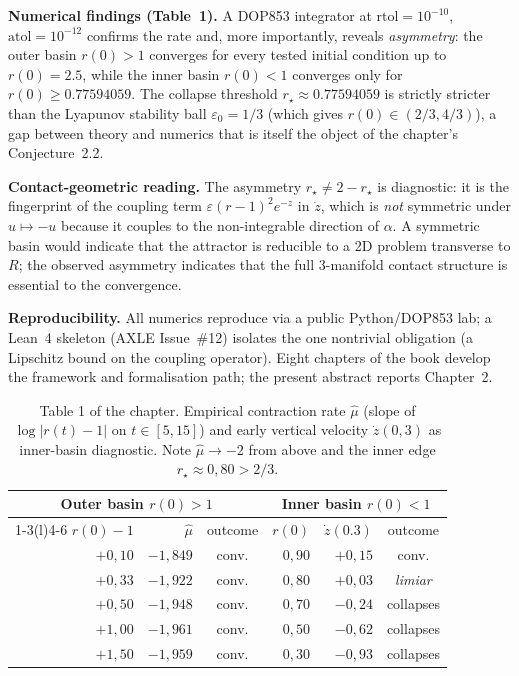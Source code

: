 \documentclass[11pt,a4paper]{article}
\begin{document}
\textbf{Numerical findings (Table~1).} A DOP853 integrator at $\mathrm{rtol}=10^{-10}$, $\mathrm{atol}=10^{-12}$ confirms the rate and, more importantly, reveals \emph{asymmetry}: the outer basin $r(0)>1$ converges for every tested initial condition up to $r(0)=2.5$, while the inner basin $r(0)<1$ converges only for $r(0) \geq 0.77594059$. The collapse threshold $r_\star \approx 0.77594059$ is strictly stricter than the Lyapunov stability ball $\varepsilon_0 = 1/3$ (which gives $r(0) \in (2/3, 4/3)$), a gap between theory and numerics that is itself the object of the chapter's Conjecture~2.2.

\textbf{Contact-geometric reading.} The asymmetry $r_\star \neq 2-r_\star$ is diagnostic: it is the fingerprint of the coupling term $\varepsilon(r-1)^2 e^{-z}$ in $\dot z$, which is \emph{not} symmetric under $u \mapsto -u$ because it couples to the non-integrable direction of $\alpha$. A symmetric basin would indicate that the attractor is reducible to a 2D problem transverse to $R$; the observed asymmetry indicates that the full 3-manifold contact structure is essential to the convergence.

\textbf{Reproducibility.} All numerics reproduce via a public Python/DOP853 lab; a Lean~4 skeleton (AXLE Issue~\#12) isolates the one nontrivial obligation (a Lipschitz bound on the coupling operator). Eight chapters of the book develop the framework and formalisation path; the present abstract reports Chapter~2.

\begin{table}[h]
\centering
\small
\begin{tabular}{@{}rrc@{\hskip 1.5em}rrc@{}}
\toprule
\multicolumn{3}{c}{\textbf{Outer basin} $r(0)>1$} & \multicolumn{3}{c}{\textbf{Inner basin} $r(0)<1$} \\
\cmidrule(lr){1-3}\cmidrule(l){4-6}
$r(0){-}1$ & $\hat\mu$ & outcome & $r(0)$ & $\dot z(0.3)$ & outcome \\
\midrule
$+0{,}10$ & $-1{,}849$ & conv. & $0{,}90$ & $+0{,}15$ & conv. \\
$+0{,}33$ & $-1{,}922$ & conv. & $0{,}80$ & $+0{,}03$ & \emph{limiar} \\
$+0{,}50$ & $-1{,}948$ & conv. & $0{,}70$ & $-0{,}24$ & collapses \\
$+1{,}00$ & $-1{,}961$ & conv. & $0{,}50$ & $-0{,}62$ & collapses \\
$+1{,}50$ & $-1{,}959$ & conv. & $0{,}30$ & $-0{,}93$ & collapses \\
\bottomrule
\end{tabular}
\caption{Table 1 of the chapter. Empirical contraction rate $\hat\mu$ (slope of $\log|r(t)-1|$ on $t\in[5,15]$) and early vertical velocity $\dot z(0{,}3)$ as inner-basin diagnostic. Note $\hat\mu \to -2$ from above and the inner edge $r_\star\approx 0{,}80 > 2/3$.}
\end{table}
\end{document}
